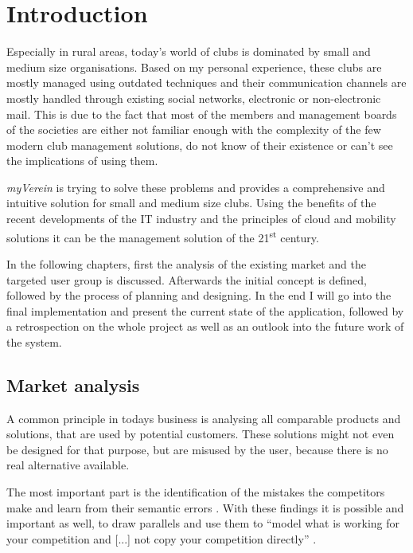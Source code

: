 \pagestyle{fancy}
\lhead{}
\renewcommand{\headrulewidth}{0pt}
\setlength{\headheight}{14pt}

\chapter{Introduction}
\label{chapter:Intro}

Especially in rural areas, today's world of clubs is dominated by small and medium size organisations. Based on my personal experience, these clubs are mostly managed using outdated techniques and their communication channels are mostly handled through existing social networks, electronic or non-electronic mail. This is due to the fact that most of the members and management boards of the societies are either not familiar enough with the complexity of the few modern club management solutions, do not know of their existence or can't see the implications of using them.

\emph{myVerein} is trying to solve these problems and provides a comprehensive and intuitive solution for small and medium size clubs. Using the benefits of the recent developments of the IT industry and the principles of cloud and mobility solutions it can be the management solution of the 21\textsuperscript{st} century. 

In the following chapters, first the analysis of the existing market and the targeted user group is discussed. Afterwards the initial concept is defined, followed by the process of planning and designing. In the end I will go into the final implementation and present the current state of the application, followed by a retrospection on the whole project as well as an outlook into the future work of the system.

\section{Market analysis}
\label{sec:MarketAnalysis}

A common principle in todays business is analysing all comparable products and solutions, that are used by potential customers. These solutions might not even be designed for that purpose, but are misused by the user, because there is no real alternative available.

The most important part is the identification of the mistakes the competitors make and learn from their semantic errors \cite{Hunter:2015aa}. With these findings it is possible and important as well, to draw parallels and use them to \enquote{model what is working for your competition and [...] not copy your competition directly} \cite{Hunter:2015aa}. 

